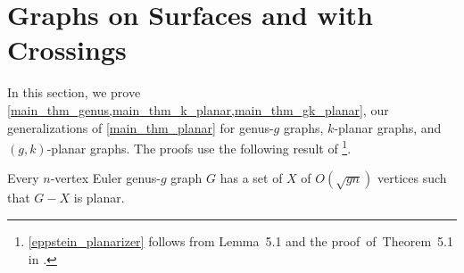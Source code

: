 \documentclass{patmorin}
\newcommand{\david}[1]{{\color{orange} David: #1}}
\newcommand{\pat}[1]{\textcolor{Blue}{Pat: #1}}
\begin{document}
\section{Graphs on Surfaces and with Crossings}
\label{genus_section}
\label{k_planar_section}

In this section, we prove \cref{main_thm_genus,main_thm_k_planar,main_thm_gk_planar}, our generalizations of \cref{main_thm_planar} for genus-$g$ graphs, $k$-planar graphs, and $(g,k)$-planar graphs. The proofs use the following result  of \citet{eppstein:dynamic}\footnote{\cref{eppstein_planarizer} follows from Lemma~5.1 and the proof~of~Theorem~5.1 in \cite{eppstein:dynamic}.}.

\begin{thm}
\label{eppstein_planarizer}
  Every $n$-vertex Euler genus-$g$ graph $G$ has a set of $X$ of $O(\sqrt{gn})$ vertices such that $G-X$ is planar. 
\end{thm}





\end{document}
